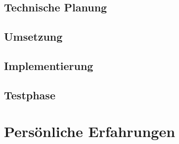 	\subsection{Technische Planung}

	\subsection{Umsetzung}

	\subsection{Implementierung}

	\subsection{Testphase}

\section{Persönliche Erfahrungen}
